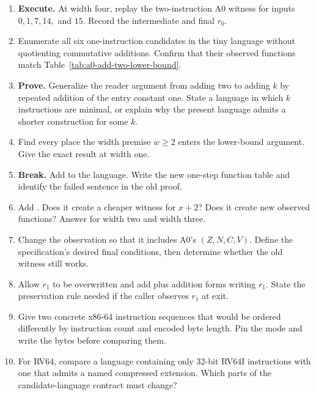 \begin{enumerate}
\item \textbf{Execute.} At width four, replay the two-instruction A0 witness
for inputs \(0,1,7,14,\) and \(15\). Record the intermediate and final \(r_0\).

\item Enumerate all six one-instruction candidates in the tiny language
without quotienting commutative additions. Confirm that their observed
functions match Table~\ref{tab:a0-add-two-lower-bound}.

\item \textbf{Prove.} Generalize the reader argument from adding two to adding
\(k\) by repeated addition of the entry constant one. State a language in
which \(k\) instructions are minimal, or explain why the present language
admits a shorter construction for some \(k\).

\item Find every place the width premise \(w\geq2\) enters the lower-bound
argument. Give the exact result at width one.

\item \textbf{Break.} Add  to the language. Write the new
one-step function table and identify the failed sentence in the old proof.

\item Add . Does it create a cheaper witness for \(x+2\)?
Does it create new observed functions? Answer for width two and width three.

\item Change the observation so that it includes A0's \((Z,N,C,V)\). Define the
specification's desired final conditions, then determine whether the old
witness still works.

\item Allow \(r_1\) to be overwritten and add  plus addition
forms writing \(r_1\). State the preservation rule needed if the caller
observes \(r_1\) at exit.

\item Give two concrete x86-64 instruction sequences that would be ordered
differently by instruction count and encoded byte length. Pin the mode and
write the bytes before comparing them.

\item For RV64, compare a language containing only 32-bit RV64I instructions
with one that admits a named compressed extension. Which parts of the
candidate-language contract must change?


\end{enumerate}
